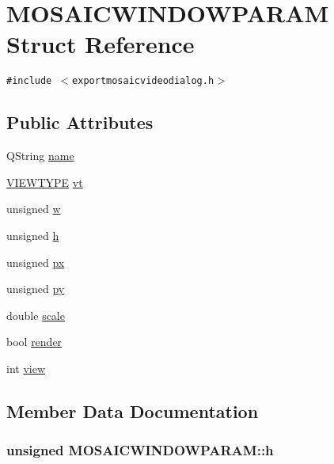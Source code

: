 \hypertarget{struct_m_o_s_a_i_c_w_i_n_d_o_w_p_a_r_a_m}{
\section{MOSAICWINDOWPARAM Struct Reference}
\label{struct_m_o_s_a_i_c_w_i_n_d_o_w_p_a_r_a_m}
}
{\tt \#include $<$exportmosaicvideodialog.h$>$}

\subsection*{Public Attributes}
\begin{CompactItemize}
\item 
QString \hyperlink{struct_m_o_s_a_i_c_w_i_n_d_o_w_p_a_r_a_m_e9b555a366c4de6d4e37c5ffb10a60e4}{name}
\item 
\hyperlink{data_8h_df19f45a6b4a54e345761faa6837c333}{VIEWTYPE} \hyperlink{struct_m_o_s_a_i_c_w_i_n_d_o_w_p_a_r_a_m_1ec63476fd857df5cb006bd9e97f4cd5}{vt}
\item 
unsigned \hyperlink{struct_m_o_s_a_i_c_w_i_n_d_o_w_p_a_r_a_m_dfd1ee1bdbc96d96b0c5b4744bf25a22}{w}
\item 
unsigned \hyperlink{struct_m_o_s_a_i_c_w_i_n_d_o_w_p_a_r_a_m_4cb5f1f7eb82a7fbced98c25336db01d}{h}
\item 
unsigned \hyperlink{struct_m_o_s_a_i_c_w_i_n_d_o_w_p_a_r_a_m_bf3b084d38816733d338dcf6bc359bef}{px}
\item 
unsigned \hyperlink{struct_m_o_s_a_i_c_w_i_n_d_o_w_p_a_r_a_m_9eff71b8d41fcc498c2724ac105a7b3b}{py}
\item 
double \hyperlink{struct_m_o_s_a_i_c_w_i_n_d_o_w_p_a_r_a_m_5c1ad314a3205bcfafe2e8379d23dca5}{scale}
\item 
bool \hyperlink{struct_m_o_s_a_i_c_w_i_n_d_o_w_p_a_r_a_m_2be63cd224fa78206e8a3adb305fd52d}{render}
\item 
int \hyperlink{struct_m_o_s_a_i_c_w_i_n_d_o_w_p_a_r_a_m_35eb3c52f7b9c134bf8d8431301ddf28}{view}
\end{CompactItemize}


\subsection{Member Data Documentation}
\hypertarget{struct_m_o_s_a_i_c_w_i_n_d_o_w_p_a_r_a_m_4cb5f1f7eb82a7fbced98c25336db01d}{
\subsubsection[{h}]{\setlength{\rightskip}{0pt plus 5cm}unsigned {\bf MOSAICWINDOWPARAM::h}}}
\label{struct_m_o_s_a_i_c_w_i_n_d_o_w_p_a_r_a_m_4cb5f1f7eb82a7fbced98c25336db01d}


